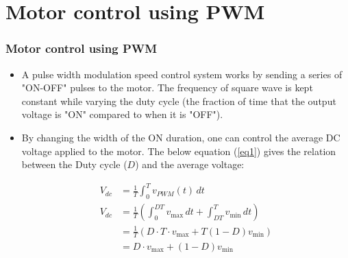 \documentclass[xcolor=table]{beamer}
\begin{document}
\section{Motor control using PWM}
\begin{frame}
\frametitle{Motor control using PWM}
\begin{itemize}
	\item A pulse width modulation speed control system works by sending a series of "ON-OFF" pulses
to the motor. The frequency of square wave is kept constant while varying the duty cycle (the
fraction of time that the output voltage is "ON" compared to when it is "OFF").
	\item By changing the width of the ON duration, one can control the average DC voltage applied to
the motor. The below equation (\ref{eq1}) gives the relation between the Duty cycle ($D$) and the average voltage:

\begin{align}
V_{dc}&={\frac {1}{T}}\int _{0}^{T}v_{PWM}(t)\,dt  \label{eq1} \\
V_{dc} &= {\frac {1}{T}}\left(\int _{0}^{DT}v_{\text{max}}\,dt+\int _{DT}^{T}v_{\text{min}}\,dt\right) \nonumber \\ \nonumber
&={\frac {1}{T}}\left(D\cdot T\cdot v_{\text{max}}+T\left(1-D\right)v_{\text{min}}\right)\\ \nonumber
&=D\cdot v_{\text{max}}+\left(1-D\right)v_{\text{min}} 
\end{align}
\end{itemize}
\end{frame}
\end{document}
